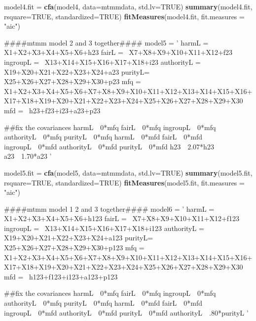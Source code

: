 \documentclass[english,man]{apa6}
\newenvironment{Shaded}{\begin{snugshade}}{\end{snugshade}}
\newcommand{\KeywordTok}[1]{\textcolor[rgb]{0.13,0.29,0.53}{\textbf{#1}}}
\newcommand{\DataTypeTok}[1]{\textcolor[rgb]{0.13,0.29,0.53}{#1}}
\newcommand{\StringTok}[1]{\textcolor[rgb]{0.31,0.60,0.02}{#1}}
\newcommand{\OtherTok}[1]{\textcolor[rgb]{0.56,0.35,0.01}{#1}}
\newcommand{\NormalTok}[1]{#1}
\theoremstyle{definition}
\theoremstyle{definition}
\theoremstyle{definition}
\theoremstyle{remark}
\begin{document}
\begin{Shaded}
\begin{Highlighting}[]
\NormalTok{model4.fit =}\StringTok{ }\KeywordTok{cfa}\NormalTok{(model4, }\DataTypeTok{data=}\NormalTok{mtmmdata, }\DataTypeTok{std.lv=}\OtherTok{TRUE}\NormalTok{)}
\KeywordTok{summary}\NormalTok{(model4.fit, }\DataTypeTok{rsquare=}\OtherTok{TRUE}\NormalTok{, }\DataTypeTok{standardized=}\OtherTok{TRUE}\NormalTok{)}
\KeywordTok{fitMeasures}\NormalTok{(model4.fit, }\DataTypeTok{fit.measures =} \StringTok{"aic"}\NormalTok{)}

\NormalTok{####mtmm model 2 and 3 together####}
\NormalTok{model5 =}\StringTok{ '}
\StringTok{harmL =~ X1+X2+X3+X4+X5+X6+h23}
\StringTok{fairL =~ X7+X8+X9+X10+X11+X12+f23}
\StringTok{ingroupL =~ X13+X14+X15+X16+X17+X18+i23}
\StringTok{authorityL =~ X19+X20+X21+X22+X23+X24+a23}
\StringTok{purityL=~ X25+X26+X27+X28+X29+X30+p23}
\StringTok{mfq =~ X1+X2+X3+X4+X5+X6+X7+X8+X9+X10+X11+X12+X13+X14+X15+X16+X17+X18+X19+X20+X21+X22+X23+X24+X25+X26+X27+X28+X29+X30}
\StringTok{mfd =~ h23+f23+i23+a23+p23}

\StringTok{##fix the covariances}
\StringTok{harmL~~0*mfq}
\StringTok{fairL~~0*mfq}
\StringTok{ingroupL~~0*mfq}
\StringTok{authorityL~~0*mfq}
\StringTok{purityL~~0*mfq}
\StringTok{harmL~~0*mfd}
\StringTok{fairL~~0*mfd}
\StringTok{ingroupL~~0*mfd}
\StringTok{authorityL~~0*mfd}
\StringTok{purityL~~0*mfd}
\StringTok{h23~~2.07*h23}
\StringTok{a23~~1.70*a23}
\StringTok{'}

\NormalTok{model5.fit =}\StringTok{ }\KeywordTok{cfa}\NormalTok{(model5, }\DataTypeTok{data=}\NormalTok{mtmmdata, }\DataTypeTok{std.lv=}\OtherTok{TRUE}\NormalTok{)}
\KeywordTok{summary}\NormalTok{(model5.fit, }\DataTypeTok{rsquare=}\OtherTok{TRUE}\NormalTok{, }\DataTypeTok{standardized=}\OtherTok{TRUE}\NormalTok{)}
\KeywordTok{fitMeasures}\NormalTok{(model5.fit, }\DataTypeTok{fit.measures =} \StringTok{"aic"}\NormalTok{)}

\NormalTok{####mtmm model 1 2 and 3 together####}
\NormalTok{model6 =}\StringTok{ '}
\StringTok{harmL =~ X1+X2+X3+X4+X5+X6+h123}
\StringTok{fairL =~ X7+X8+X9+X10+X11+X12+f123}
\StringTok{ingroupL =~ X13+X14+X15+X16+X17+X18+i123}
\StringTok{authorityL =~ X19+X20+X21+X22+X23+X24+a123}
\StringTok{purityL=~ X25+X26+X27+X28+X29+X30+p123}
\StringTok{mfq =~ X1+X2+X3+X4+X5+X6+X7+X8+X9+X10+X11+X12+X13+X14+X15+X16+X17+X18+X19+X20+X21+X22+X23+X24+X25+X26+X27+X28+X29+X30}
\StringTok{mfd =~ h123+f123+i123+a123+p123}

\StringTok{##fix the covariances}
\StringTok{harmL~~0*mfq}
\StringTok{fairL~~0*mfq}
\StringTok{ingroupL~~0*mfq}
\StringTok{authorityL~~0*mfq}
\StringTok{purityL~~0*mfq}
\StringTok{harmL~~0*mfd}
\StringTok{fairL~~0*mfd}
\StringTok{ingroupL~~0*mfd}
\StringTok{authorityL~~0*mfd}
\StringTok{purityL~~0*mfd}
\StringTok{authorityL~~.80*purityL}
\StringTok{'}


\end{Highlighting}
\end{Shaded}
\end{document}
